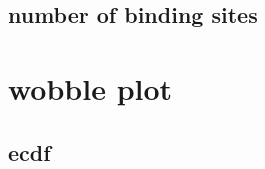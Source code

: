 \documentclass[
]{article}
\newenvironment{Shaded}{\begin{snugshade}}{\end{snugshade}}
\newcommand{\FunctionTok}[1]{\textcolor[rgb]{0.13,0.29,0.53}{\textbf{#1}}}
\newcommand{\NormalTok}[1]{#1}
\newcommand{\OtherTok}[1]{\textcolor[rgb]{0.56,0.35,0.01}{#1}}
\newcommand{\SpecialCharTok}[1]{\textcolor[rgb]{0.81,0.36,0.00}{\textbf{#1}}}
\newcommand{\StringTok}[1]{\textcolor[rgb]{0.31,0.60,0.02}{#1}}
\begin{document}
\hypertarget{number-of-binding-sites}{%
\subsection{number of binding sites}\label{number-of-binding-sites}}

\begin{Shaded}
\end{Shaded}

\hypertarget{wobble-plot}{%
\section{wobble plot}\label{wobble-plot}}

\hypertarget{ecdf}{%
\subsection{ecdf}\label{ecdf}}
\end{document}
